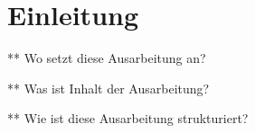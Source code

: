\section{Einleitung}
\label{sec:Einleitung}

** Wo setzt diese Ausarbeitung an?

** Was ist Inhalt der Ausarbeitung?

** Wie ist diese Ausarbeitung strukturiert?